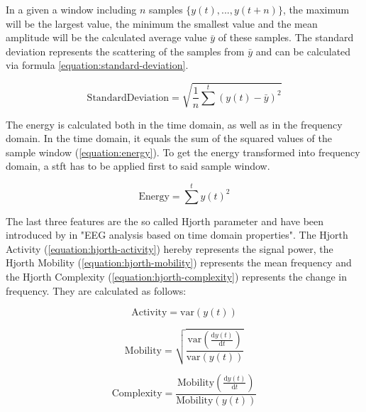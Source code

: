 In a given a window including $n$ samples $\{y(t), ..., y(t + n)\}$, the maximum will be the largest value, the minimum the smallest value and the mean amplitude will be the calculated average value $\bar{y}$ of these samples. The standard deviation represents the scattering of the samples from $\bar{y}$ and can be calculated via formula \ref{equation:standard-deviation}.

\begin{equation}
\label{equation:standard-deviation}
    \mathrm{Standard Deviation}=\sqrt{\frac{1}{n}\sum^{t}(y(t)-\bar{y})^{2}}
\end{equation}

The energy is calculated both in the time domain, as well as in the frequency domain. In the time domain, it equals the sum of the squared values of the sample window (\ref{equation:energy}). To get the energy transformed into frequency domain, a \gls{stft} has to be applied first to said sample window.

\begin{equation}
\label{equation:energy}
    \mathrm{Energy}=\sum^{t}y(t)^{2}
\end{equation}

The last three features are the so called Hjorth parameter and have been introduced by \textcite[]{hjorth1970eeg} in "EEG analysis based on time domain properties". The Hjorth Activity (\ref{equation:hjorth-activity}) hereby represents the signal power, the Hjorth Mobility (\ref{equation:hjorth-mobility}) represents the mean frequency and the Hjorth Complexity (\ref{equation:hjorth-complexity}) represents the change in frequency. They are calculated as follows:

\begin{equation}
\label{equation:hjorth-activity}
    \mathrm{Activity}=\mathrm{var}(y(t))
\end{equation}

\begin{equation}
\label{equation:hjorth-mobility}
    \mathrm{Mobility}=\sqrt{\frac{\mathrm{var}(\frac{\mathrm{d}y(t)}{\mathrm{d}t})}{\mathrm{var}(y(t))}}
\end{equation}

\begin{equation}
\label{equation:hjorth-complexity}
    \mathrm{Complexity}=\frac{\mathrm{Mobility}(\frac{\mathrm{d}y(t)}{\mathrm{d}t})}{\mathrm{Mobility}(y(t))}
\end{equation}
